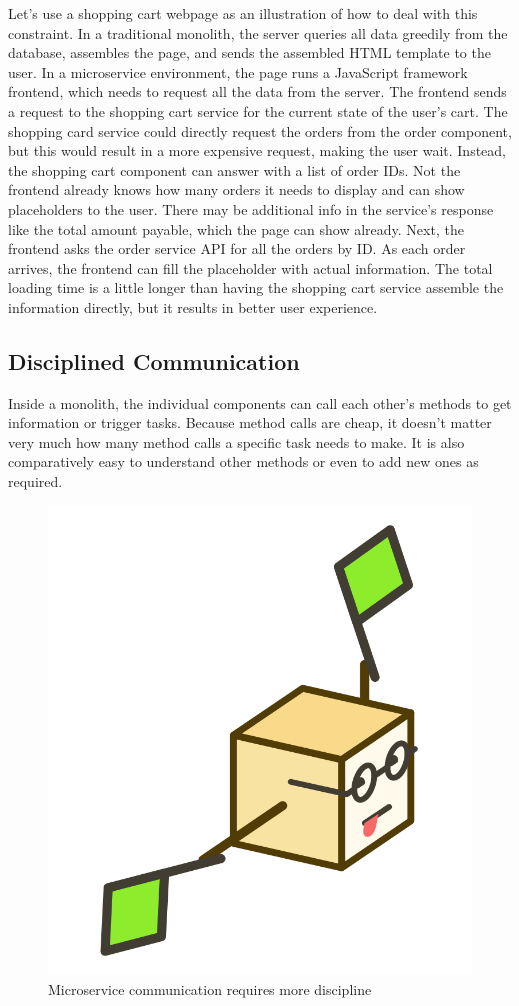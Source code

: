 Let's use a shopping cart webpage as an illustration of how to deal with this constraint. In a traditional monolith, the server queries all data greedily from the database, assembles the page, and sends the assembled HTML template to the user. In a microservice environment, the page runs a JavaScript framework frontend, which needs to request all the data from the server. The frontend sends a request to the shopping cart service for the current state of the user's cart. The shopping card service could directly request the orders from the order component, but this would result in a more expensive request, making the user wait. Instead, the shopping cart component can answer with a list of order IDs. Not the frontend already knows how many orders it needs to display and can show placeholders to the user. There may be additional info in the service's response like the total amount payable, which the page can show already. Next, the frontend asks the order service API for all the orders by ID. As each order arrives, the frontend can fill the placeholder with actual information. The total loading time is a little longer than having the shopping cart service assemble the information directly, but it results in better user experience.


\subsection{Disciplined Communication}

Inside a monolith, the individual components can call each other's methods to get information or trigger tasks. Because method calls are cheap, it doesn't matter very much how many method calls a specific task needs to make. It is also comparatively easy to understand other methods or even to add new ones as required.

\begin{figure}[ht]
  \centering
  \includegraphics[width=0.25\linewidth]{assets/illustration-microservice-flags.png}
  \caption{Microservice communication requires more discipline}
\end{figure}

